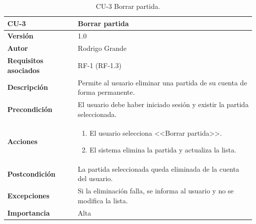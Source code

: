 \begin{table}[p]
	\centering
	\begin{tabularx}{\linewidth}{ p{} p{} }
		\toprule
		\textbf{CU-3} & \textbf{Borrar partida}\\
		\toprule
		\textbf{Versión}              & 1.0    \\
		\textbf{Autor}                & Rodrigo Grande \\
		\textbf{Requisitos asociados} & RF-1 (RF-1.3) \\
		\textbf{Descripción}          & Permite al usuario eliminar una partida de su cuenta de forma permanente.\\
		\textbf{Precondición}         & El usuario debe haber iniciado sesión y existir la partida seleccionada. \\
		\textbf{Acciones}             &
		\begin{enumerate}
			\def\labelenumi{\arabic{enumi}.}
			\tightlist
			\item El usuario selecciona <<Borrar partida>>.
			\item El sistema elimina la partida y actualiza la lista.
		\end{enumerate}\\
		\textbf{Postcondición}        & La partida seleccionada queda eliminada de la cuenta del usuario. \\
		\textbf{Excepciones}          & Si la eliminación falla, se informa al usuario y no se modifica la lista. \\
		\textbf{Importancia}          & Alta \\
		\bottomrule
	\end{tabularx}
	\caption{CU-3 Borrar partida.}
	\label{cu:borrar-partida}
\end{table}

